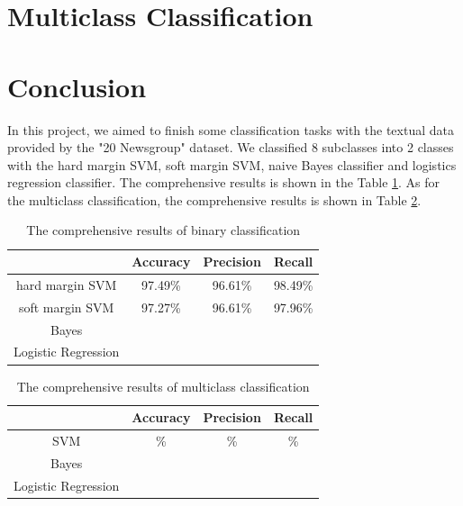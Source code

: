 \documentclass{article}
\begin{document}
\section{Multiclass Classification}\label{sec:multi}
\section{Conclusion}
In this project, we aimed to finish some classification tasks with the textual data provided by the "20 Newsgroup" dataset. We classified 8 subclasses into 2 classes with the hard margin SVM, soft margin SVM, naive Bayes classifier and logistics regression classifier. The comprehensive results is shown in the Table \ref{tb:binaryresults}. As for the multiclass classification, the comprehensive results is shown in Table \ref{tb:multiresults}.
\begin{table}
\begin{center}
\caption{The comprehensive results of binary classification}
\label{tb:binaryresults}
\begin{tabular}{|c|c|c|c|}
\hline
& Accuracy& Precision& Recall\\
\hline
hard margin SVM& 97.49\%&96.61\% &98.49\% \\
\hline
soft margin SVM& 97.27\%&96.61\% &97.96\% \\
\hline 	
Bayes& & & \\
\hline
Logistic Regression& & &\\
\hline
\end{tabular}
\end{center}
\end{table}

\begin{table}
\begin{center}
\caption{The comprehensive results of multiclass classification}
\label{tb:multiresults}
\begin{tabular}{|c|c|c|c|}
\hline
& Accuracy& Precision& Recall\\
\hline
SVM& \%&\% &\% \\
\hline
Bayes& & & \\
\hline
Logistic Regression& & &\\
\hline
\end{tabular}
\end{center}
\end{table}
\end{document}
